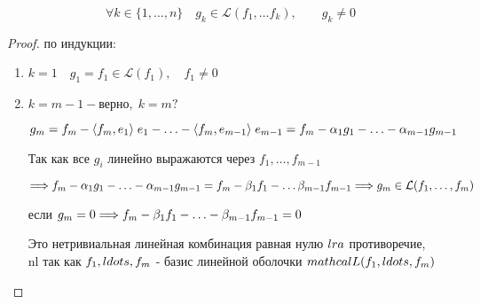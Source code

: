 \vspace{0.4cm}

\begin{shth}
    \begin{lemma}
        \[ \forall k \in {\{1, \ldots, n \}} \quad g_{k} \in \mathcal{L}(f_{1}, \ldots f_{k}), \qquad g_{k} \neq 0 \]
    \end{lemma}
\end{shth}

\vspace{0.4cm}
\begin{proof}
    по индукции:
    
    \begin{enumerate}
    
    
        \item $ k = 1 \quad g_{1} = f_{1} \in \mathcal{L}(f_{1}), \quad f_{1} \neq 0$
        
        
        \item $k = m - 1  - \text{верно}, \; k = m ?$ 
        \nl

        $g_{m} = f_{m} - \langle f_{m}, e_{1} \rangle \; e_{1} - \ldots - \langle f_{m}, e_{m-1} \rangle \; e_{m-1} = f_{m} - \alpha_{1} g_{1} - \ldots - \alpha_{m-1} g_{m-1}$
        \nl
        
        Так как все $g_{i}$ линейно выражаются через $f_{1}, \ldots, f_{m-1}$
        \nl
        
        $\lra  f_{m} - \alpha_{1} g_{1} - \ldots - \alpha_{m-1} g_{m-1} = f_{m} - \beta_{1}f_{1} - \ldots \beta_{m-1}f_{m-1} \quad  \nl \lra g_{m} \in \mathcal{L}(f_{1}, \ldots, f_{m})$        
        \nl 
        
        если $g_{m} = 0 \Longrightarrow f_{m} - \beta_{1}f_{1} - \ldots - \beta_{m-1}f_{m-1} = 0$
        \nl 
        
        Это нетривиальная линейная комбинация равная нулю $\\lra$ противоречие, \\nl так как $f_{1}, \\ldots, f_{m}$ - базис линейной оболочки $\\mathcal{L}(f_{1}, \\ldots, f_{m})$ 
    \end{enumerate}
\end{proof}

\clearpage

